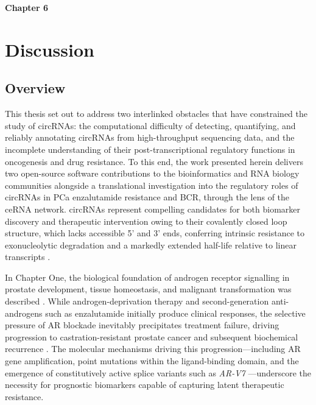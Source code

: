 {\Huge \bfseries \noindent Chapter 6}
\vspace{-1em} 
\section*{\LARGE Discussion}
\setcounter{section}{6}
\setcounter{subsection}{0}
\renewcommand{\chapternum}{6}

\renewcommand{\thefigure}{\chapternum.\arabic{figure}}
\setcounter{figure}{0}
\renewcommand{\thetable}{\chapternum.\arabic{table}}
\setcounter{table}{0}

\vspace{2em}

\subsection{Overview}
This thesis set out to address two interlinked obstacles that have constrained the study of circRNAs: the computational difficulty of detecting, quantifying, and reliably annotating circRNAs from high-throughput sequencing data, and the incomplete understanding of their post-transcriptional regulatory functions in oncogenesis and drug resistance. To this end, the work presented herein delivers two open-source software contributions to the bioinformatics and RNA biology communities alongside a translational investigation into the regulatory roles of circRNAs in PCa enzalutamide resistance and BCR, through the lens of the ceRNA network. circRNAs represent compelling candidates for both biomarker discovery and therapeutic intervention owing to their covalently closed loop structure, which lacks accessible 5' and 3' ends, conferring intrinsic resistance to exonucleolytic degradation and a markedly extended half-life relative to linear transcripts \cite{Salzman2012, Li2015Aug}.

In Chapter One, the biological foundation of androgen receptor signalling in prostate development, tissue homeostasis, and malignant transformation was described \cite{Rebello2021Feb}. While androgen-deprivation therapy and second-generation anti-androgens such as enzalutamide initially produce clinical responses, the selective pressure of AR blockade inevitably precipitates treatment failure, driving progression to castration-resistant prostate cancer and subsequent biochemical recurrence \cite{Scher2012Sep, Cornford2017, Rans2022, Shore2024}. The molecular mechanisms driving this progression—including AR gene amplification, point mutations within the ligand-binding domain, and the emergence of constitutively active splice variants such as \textit{AR-V7} \cite{Azad2015May, Hu2009Jan, Csizmarik2021Oct}—underscore the necessity for prognostic biomarkers capable of capturing latent therapeutic resistance.


